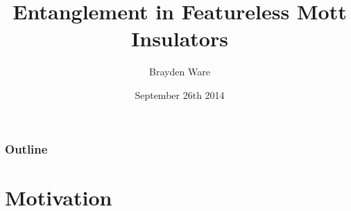 \documentclass[t]{beamer}
\title{Entanglement in Featureless Mott Insulators}
\author{Brayden Ware}
\date{September 26th 2014}
\begin{document}
\frame{\titlepage}



% 

\section*{}

\begin{frame}
  \frametitle{Outline}
  \vskip-1.5cm
  \tableofcontents
\end{frame}

\AtBeginSection[]
{
\frame{
  \vspace{2cm}
  {\huge \insertsection}
  }
}


\section{Motivation}











\end{document}
